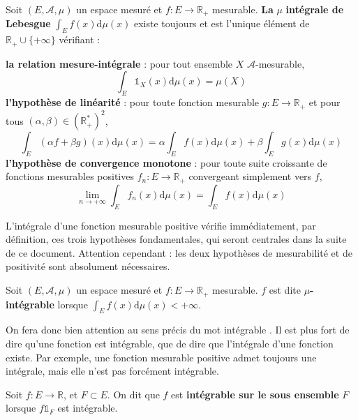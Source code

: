 \documentclass[../integ-proba.tex]{subfiles}
\begin{document}
\begin{defi}
  Soit $\left(E,\mathcal{A},\mu\right)$ un espace mesuré et $f:E\rightarrow\mathbb{R}_+$ mesurable.
  \textbf{La} $\mu $\textbf{ intégrale de Lebesgue } $\displaystyle\int_Ef(x)\text{d}\mu(x)$ existe toujours et est l'unique élément de $\mathbb{R}_+\cup\{+\infty\}$ vérifiant :
  \begin{itemize}
    \itemb \textbf{la relation mesure-intégrale} : pour tout ensemble $X$ $\mathcal{A}$-mesurable,
    $$
    \int_E\mathds{1}_X(x)\text{d}\mu(x)=\mu(X)
    $$ 
    \itemb \textbf{l'hypothèse de linéarité} : pour toute fonction mesurable $g:E\rightarrow\mathbb{R}_+$ et pour tous $\left(\alpha,\beta\right) \in \left(\mathbb{R}_+^*\right)^2$,
    $$
    \int_E (\alpha f + \beta g)(x) \text{d}\mu(x)=\alpha\int_Ef(x)\text{d}\mu(x) + \beta\int_Eg(x)\text{d}\mu(x)
    $$
    \itemb \textbf{l'hypothèse de convergence monotone} : pour toute suite croissante de fonctions mesurables positives $f_n:E\rightarrow\mathbb{R}_+$ convergeant simplement vers $f$,
    $$
    \lim_{n\rightarrow+\infty}\int_Ef_n(x)\text{d}\mu(x)=\int_Ef(x)\text{d}\mu(x)
    $$
  \end{itemize}
\end{defi}

\begin{rem}
  L'intégrale d'une fonction mesurable positive vérifie immédiatement, par définition, ces trois hypothèses fondamentales, qui seront centrales dans la suite de ce document.
  Attention cependant : les deux hypothèses de mesurabilité et de positivité sont absolument nécessaires.
\end{rem}

\begin{defi}
  Soit $\left(E,\mathcal{A},\mu\right)$ un espace mesuré et $f:E\rightarrow\mathbb{R}_+$ mesurable.
  $f$ est dite $\mu$\textbf{-intégrable} lorsque $\displaystyle\int_Ef(x)\text{d}\mu(x) < +\infty$.
\end{defi}

\begin{rem}
  \label{rem:attint}
  On fera donc bien attention au sens précis du mot \og intégrable \fg.
  Il est plus fort de dire qu'une fonction est intégrable, que de dire que l'intégrale d'une fonction existe.
  Par exemple, une fonction mesurable positive admet toujours une intégrale, mais elle n'est pas forcément intégrable.
\end{rem}

\begin{defi}
  Soit $f:E\longrightarrow\mathbb{R}$, et $F\subset E$.
  On dit que $f$ est \textbf{intégrable sur le sous ensemble} $F$ lorsque $f\mathds{1}_F$ est intégrable.
\end{defi}
\end{document}
